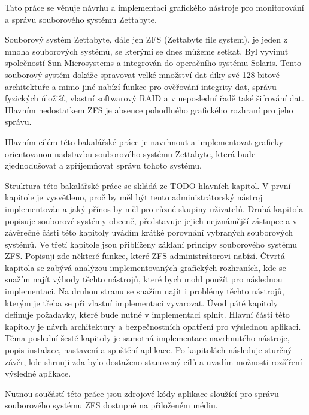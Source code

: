 
Tato práce se věnuje návrhu a implementaci grafického nástroje pro monitorování a správu souborového systému Zettabyte.

Souborový systém Zettabyte, dále jen ZFS (Zettabyte file system), je jeden z mnoha souborových systémů, se kterými se dnes můžeme setkat.
Byl vyvinut společností Sun Microsystems a integrován do operačního systému Solaris. Tento souborový systém dokáže spravovat velké množství dat
díky své 128-bitové architektuře a mimo jiné nabízí funkce pro ověřování integrity dat, správu fyzických úložišť, vlastní softwarový RAID a v neposlední
řadě také šifrování dat. Hlavním nedostatkem ZFS je absence pohodlného grafického rozhraní pro jeho správu.

Hlavním cílém této bakalářské práce je navrhnout a implementovat graficky orientovanou nadstavbu souborového systému Zettabyte, která bude zjednodušovat
a zpříjemňovat správu tohoto systému.

Struktura této bakalářské práce se skládá ze TODO hlavních kapitol.
V první kapitole je vysvětleno, proč by měl být tento administrátorský nástroj
implementován a jaký přínos by měl pro různé skupiny uživatelů.
Druhá kapitola popisuje souborové systémy obecně, představuje jejich nejznámější zástupce a v závěrečné části této kapitoly uvádím krátké porovnání vybraných souborových systémů.
Ve třetí kapitole jsou přiblíženy záklaní principy souborového systému ZFS. Popisuji zde některé funkce, které ZFS administrátorovi nabízí.
Čtvrtá kapitola se zabývá analýzou implementovaných grafických rozhraních, kde se snažím najít výhody těchto nástrojů, které bych mohl použít pro následnou implementaci. Na druhou stranu se snažím najít i problémy těchto nástrojů, kterým je třeba se při vlastní implementaci vyvarovat.
Úvod páté kapitoly definuje požadavky, které bude nutné v implementaci splnit. Hlavní částí této kapitoly je návrh architektury a bezpečnostních opatření pro výslednou aplikaci.
Téma poslední šesté kapitoly je samotná implementace navrhnutého nástroje, popis instalace, nastavení a spuštění aplikace. Po kapitolách následuje sturčný
závěr, kde shrnuji zda bylo dostaženo stanovený cílů a uvadím možnosti rozšíření výsledné aplikace.

Nutnou součástí této práce jsou zdrojové kódy aplikace sloužící pro správu souborového systému ZFS dostupné na přiloženém médiu.



